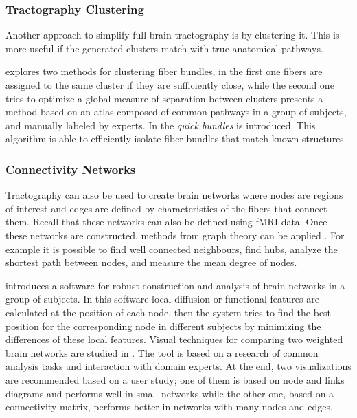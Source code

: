 \subsubsection{Tractography Clustering}

Another approach to simplify full brain tractography is by clustering it. This is more useful if the generated clusters match with true anatomical pathways.

\autocite{song_zhang_identifying_2008} explores two methods for clustering fiber bundles, in the first one fibers are assigned to the same cluster if they are sufficiently close, while the second one tries to optimize a global measure of separation between clusters
\autocite{guevara_automatic_2012} presents a method based on an atlas composed of common pathways in a group of subjects, and manually labeled by experts. 
In \autocite{garyfallidis_dipy_2014} the \emph{quick bundles} is introduced. This algorithm is able to efficiently isolate fiber bundles that match known structures.

\subsubsection{Connectivity Networks}

Tractography can also be used to create brain networks where nodes are regions of interest and edges are defined by characteristics of the fibers that connect them. Recall that these networks can also be defined using fMRI data. Once these networks are constructed, methods from graph theory can be applied \autocite{rubinov_complex_2010}. For example it is possible to find well connected neighbours, find hubs, analyze the shortest path between nodes, and measure the mean degree of nodes.

\autocite{li_visual_2012} introduces a software for robust construction and analysis of brain networks in a group of subjects. In this software local diffusion or functional features are calculated at the position of each node, then the system tries to find the best position for the corresponding node in different subjects by minimizing the differences of these local features.
Visual techniques for comparing two weighted brain networks are studied in \autocite{alper_weighted_2013}. The tool is based on a research of common analysis tasks and interaction with domain experts. At the end, two visualizations are recommended based on a user study; one of them is based on node and links diagrams and performs well in small networks while the other one, based on a connectivity matrix, performs better in networks with many nodes and edges.



